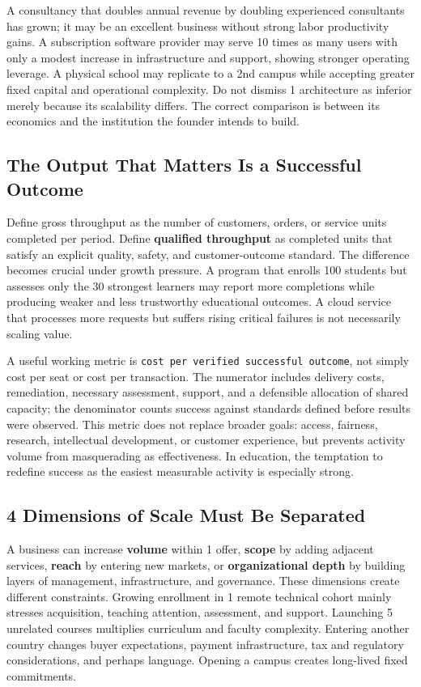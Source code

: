 A consultancy that doubles annual revenue by doubling experienced consultants has grown; it may be an excellent business without strong labor productivity gains. A subscription software provider may serve 10 times as many users with only a modest increase in infrastructure and support, showing stronger operating leverage. A physical school may replicate to a 2nd campus while accepting greater fixed capital and operational complexity. Do not dismiss 1 architecture as inferior merely because its scalability differs. The correct comparison is between its economics and the institution the founder intends to build.

\subsection{The Output That Matters Is a Successful Outcome}
\label{sec:output_successful_outcome}

Define gross throughput as the number of customers, orders, or service units completed per period. Define \textbf{qualified throughput} as completed units that satisfy an explicit quality, safety, and customer-outcome standard. The difference becomes crucial under growth pressure. A program that enrolls 100 students but assesses only the 30 strongest learners may report more completions while producing weaker and less trustworthy educational outcomes. A cloud service that processes more requests but suffers rising critical failures is not necessarily scaling value.

A useful working metric is \texttt{cost per verified successful outcome}, not simply cost per seat or cost per transaction. The numerator includes delivery costs, remediation, necessary assessment, support, and a defensible allocation of shared capacity; the denominator counts success against standards defined before results were observed. This metric does not replace broader goals: access, fairness, research, intellectual development, or customer experience, but prevents activity volume from masquerading as effectiveness. In education, the temptation to redefine success as the easiest measurable activity is especially strong.

\subsection{4 Dimensions of Scale Must Be Separated}
\label{sec:four_dimensions_of_scale}

A business can increase \textbf{volume} within 1 offer, \textbf{scope} by adding adjacent services, \textbf{reach} by entering new markets, or \textbf{organizational depth} by building layers of management, infrastructure, and governance. These dimensions create different constraints. Growing enrollment in 1 remote technical cohort mainly stresses acquisition, teaching attention, assessment, and support. Launching 5 unrelated courses multiplies curriculum and faculty complexity. Entering another country changes buyer expectations, payment infrastructure, tax and regulatory considerations, and perhaps language. Opening a campus creates long-lived fixed commitments.

